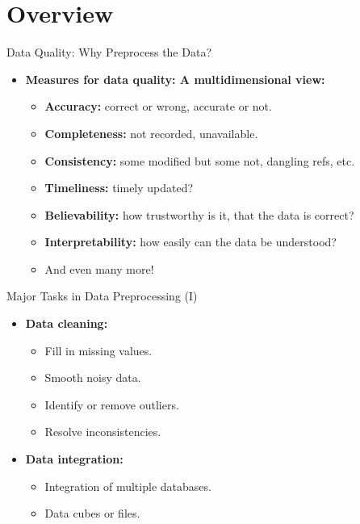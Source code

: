 \section{Overview}

\begin{frame}{Data Quality: Why Preprocess the Data?}
	\begin{itemize}
		\item \textbf{Measures for {\color{airforceblue}data quality}: A 
		multidimensional view:}
		\begin{itemize}
			\item \textbf{Accuracy:} correct or wrong, accurate or not.
			\item \textbf{Completeness:} not recorded, unavailable.
			\item \textbf{Consistency:} some modified but some not, dangling 
			refs, etc.
			\item \textbf{Timeliness:} timely updated?
			\item \textbf{Believability:} how trustworthy is it, that the data 
			is correct?
			\item \textbf{Interpretability:} how easily can the data be 
			understood?
			\item And even many more!
		\end{itemize}
	\end{itemize}
\end{frame}

\begin{frame}{Major Tasks in Data Preprocessing (I)}
	\begin{itemize}
		\item \textbf{Data cleaning:}
		\begin{itemize}
			\item Fill in missing values.
			\item Smooth noisy data.
			\item Identify or remove outliers.
			\item Resolve inconsistencies.
		\end{itemize}
		\item \textbf{Data integration:}
		\begin{itemize}
			\item Integration of multiple databases.
			\item Data cubes or files.
		\end{itemize}
	\end{itemize}
\end{frame}

